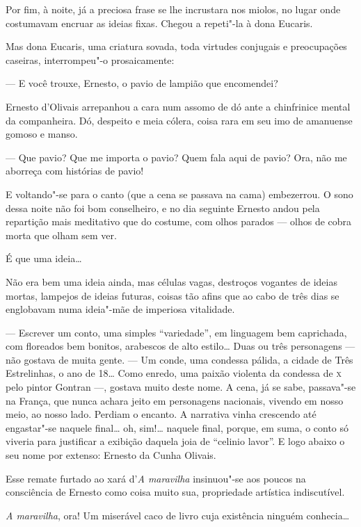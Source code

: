 Por fim, à noite, já a preciosa frase se lhe incrustara nos miolos, no
lugar onde costumavam encruar as ideias fixas. Chegou a repeti"-la à dona
Eucaris.

Mas dona Eucaris, uma criatura sovada, toda virtudes conjugais e
preocupações caseiras, interrompeu"-o prosaicamente:

--- E você trouxe, Ernesto, o pavio de lampião que encomendei?

Ernesto d'Olivais arrepanhou a cara num assomo de dó ante a chinfrinice
mental da companheira. Dó, despeito e meia cólera, coisa rara em seu imo
de amanuense gomoso e manso.

--- Que pavio? Que me importa o pavio? Quem fala aqui de pavio? Ora, não
me aborreça com histórias de pavio!

E voltando"-se para o canto (que a cena se passava na cama) embezerrou. O
sono dessa noite não foi bom conselheiro, e no dia seguinte Ernesto
andou pela repartição mais meditativo que do costume, com olhos parados
--- olhos de cobra morta que olham sem ver.

É que uma ideia\ldots{}

Não era bem uma ideia ainda, mas células vagas, destroços vogantes de
ideias mortas, lampejos de ideias futuras, coisas tão afins que ao cabo
de três dias se englobavam numa ideia"-mãe de imperiosa vitalidade.

--- Escrever um conto, uma simples ``variedade'', em linguagem bem
caprichada, com floreados bem bonitos, arabescos de alto estilo\ldots{} Duas
ou três personagens --- não gostava de muita gente. --- Um conde, uma
condessa pálida, a cidade de Três Estrelinhas, o ano de 18\ldots{} Como
enredo, uma paixão violenta da condessa de \textsc{x} pelo pintor Gontran ---,
gostava muito deste nome. A cena, já se sabe, passava"-se na França, que
nunca achara jeito em personagens nacionais, vivendo em nosso meio, ao
nosso lado. Perdiam o encanto. A narrativa vinha crescendo até
engastar"-se naquele final\ldots{} oh, sim!\ldots{} naquele final, porque, em suma,
o conto só viveria para justificar a exibição daquela joia de ``celinio
lavor''. E logo abaixo o seu nome por extenso: Ernesto da Cunha Olivais.

Esse remate furtado ao xará d'\emph{A maravilha} insinuou"-se aos poucos
na consciência de Ernesto como coisa muito sua, propriedade artística
indiscutível.

\emph{A maravilha}, ora! Um miserável caco de livro cuja existência
ninguém conhecia\ldots{}

